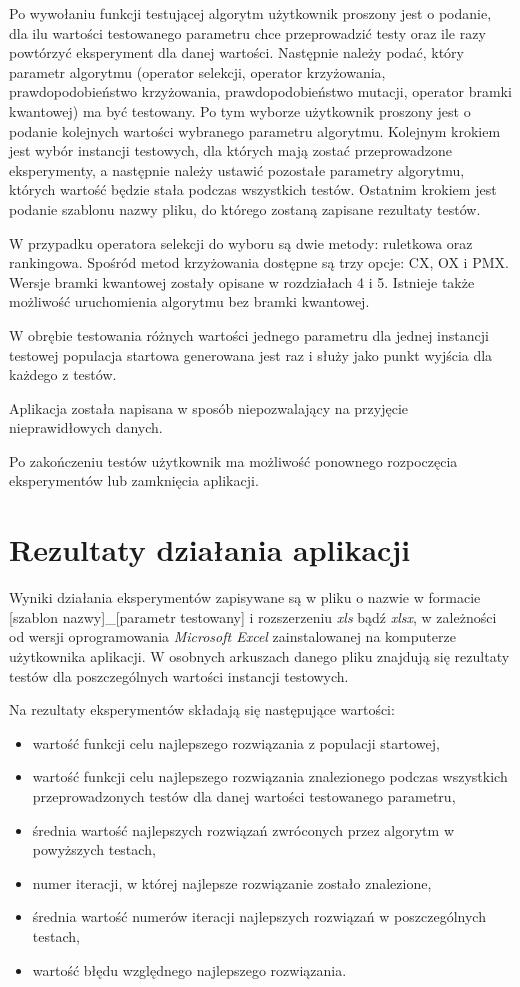 Po wywołaniu funkcji testującej algorytm użytkownik proszony jest o podanie, dla ilu wartości testowanego parametru chce przeprowadzić testy oraz ile razy powtórzyć eksperyment dla danej wartości. Następnie należy podać, który parametr algorytmu (operator selekcji, operator krzyżowania, prawdopodobieństwo krzyżowania, prawdopodobieństwo mutacji, operator bramki kwantowej) ma być testowany. Po tym wyborze użytkownik proszony jest o podanie kolejnych wartości wybranego parametru algorytmu. Kolejnym krokiem jest wybór instancji testowych, dla których mają zostać przeprowadzone eksperymenty, a następnie należy ustawić pozostałe parametry algorytmu, których wartość będzie stała podczas wszystkich testów. Ostatnim krokiem jest podanie szablonu nazwy pliku, do którego zostaną zapisane rezultaty testów. 

W przypadku operatora selekcji do wyboru są dwie metody: ruletkowa oraz rankingowa. Spośród metod krzyżowania dostępne są trzy opcje: CX, OX i PMX. Wersje bramki kwantowej zostały opisane w rozdziałach 4 i 5. Istnieje także możliwość uruchomienia algorytmu bez bramki kwantowej.

W obrębie testowania różnych wartości jednego parametru dla jednej instancji testowej populacja startowa generowana jest raz i służy jako punkt wyjścia dla każdego z testów.

Aplikacja została napisana w sposób niepozwalający na przyjęcie nieprawidłowych danych.

Po zakończeniu testów użytkownik ma możliwość ponownego rozpoczęcia eksperymentów lub zamknięcia aplikacji.

\section{Rezultaty działania aplikacji}
Wyniki działania eksperymentów zapisywane są w pliku o nazwie w formacie [szablon nazwy]\_[parametr testowany] i rozszerzeniu \textit{xls} bądź \textit{xlsx}, w zależności od wersji oprogramowania \textit{Microsoft Excel} zainstalowanej na komputerze użytkownika aplikacji. W osobnych arkuszach danego pliku znajdują się rezultaty testów dla poszczególnych wartości instancji testowych.

Na rezultaty eksperymentów składają się następujące wartości:
\begin{itemize}
\item wartość funkcji celu najlepszego rozwiązania z populacji startowej,
\item wartość funkcji celu najlepszego rozwiązania znalezionego podczas wszystkich przeprowadzonych testów dla danej wartości testowanego parametru,
\item średnia wartość najlepszych rozwiązań zwróconych przez algorytm w powyższych testach,
\item numer iteracji, w której najlepsze rozwiązanie zostało znalezione,
\item średnia wartość numerów iteracji najlepszych rozwiązań w poszczególnych testach,
\item wartość błędu względnego najlepszego rozwiązania.
\end{itemize}

